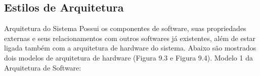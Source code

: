                 
\subsection{Estilos de Arquitetura}
Arquitetura do Sistema
Possui os componentes de software, suas propriedades externas e seus relacionamentos com outros softwares já existentes, além de estar ligada também com a arquitetura de hardware do sistema. Abaixo são mostrados dois modelos de arquitetura de hardware (Figura 9.3 e Figura 9.4).
Modelo 1 da Arquitetura de Software: